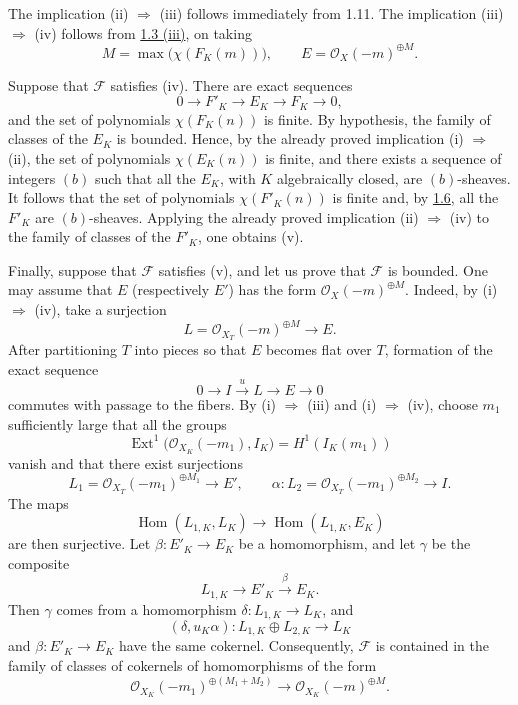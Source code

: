 The implication (ii) \(\Rightarrow\) (iii) follows immediately from 1.11.
The implication (iii) \(\Rightarrow\) (iv) follows from \hyperlink{sga6.e13.prop.1-3}{1.3 (iii)}, on
taking
\[
M=\max\bigl(\chi(F_K(m))\bigr),
\qquad E=\mathcal O_X(-m)^{\oplus M}.
\]

Suppose that \(\mathcal F\) satisfies (iv). There are exact sequences
\[
0\longrightarrow F'_K\longrightarrow E_K\longrightarrow F_K
\longrightarrow0,
\]
and the set of polynomials \(\chi(F_K(n))\) is finite. By hypothesis, the
family of classes of the \(E_K\) is bounded. Hence, by the already proved
implication (i) \(\Rightarrow\) (ii), the set of polynomials
\(\chi(E_K(n))\) is finite, and there exists a sequence of integers \((b)\)
such that all the \(E_K\), with \(K\) algebraically closed, are
\((b)\)-sheaves. It follows that the set of polynomials
\(\chi(F'_K(n))\) is finite and, by \hyperlink{sga6.e13.prop.1-6}{1.6}, all the \(F'_K\) are
\((b)\)-sheaves. Applying the already proved implication (ii)
\(\Rightarrow\) (iv) to the family of classes of the \(F'_K\), one obtains
(v).

Finally, suppose that \(\mathcal F\) satisfies (v), and let us prove that
\(\mathcal F\) is bounded. One may assume that \(E\) (respectively \(E'\))
has the form \(\mathcal O_X(-m)^{\oplus M}\). Indeed,
by (i) \(\Rightarrow\) (iv), take a surjection
\[
L=\mathcal O_{X_T}(-m)^{\oplus M}\longrightarrow E.
\]
After partitioning \(T\) into pieces so that \(E\) becomes flat over \(T\),
formation of the exact sequence
\[
0\longrightarrow I\xrightarrow{u}L\longrightarrow E\longrightarrow0
\]
commutes with passage to the fibers. By (i) \(\Rightarrow\) (iii) and
(i) \(\Rightarrow\) (iv), choose \(m_1\) sufficiently large that all the
groups
\[
\operatorname{Ext}^1\bigl(\mathcal O_{X_K}(-m_1),I_K\bigr)
=H^1(I_K(m_1))
\]
vanish and that there exist surjections
\[
L_1=\mathcal O_{X_T}(-m_1)^{\oplus M_1}\longrightarrow E',
\qquad
\alpha:L_2=\mathcal O_{X_T}(-m_1)^{\oplus M_2}\longrightarrow I.
\]
The maps
\[
\operatorname{Hom}(L_{1,K},L_K)\longrightarrow
\operatorname{Hom}(L_{1,K},E_K)
\]
are then surjective. Let \(\beta:E'_K\to E_K\) be a homomorphism, and let
\(\gamma\) be the composite
\[
L_{1,K}\longrightarrow E'_K\xrightarrow{\beta}E_K.
\]
Then \(\gamma\) comes from a homomorphism
\(\delta:L_{1,K}\to L_K\), and
\[
(\delta,u_K\alpha):L_{1,K}\oplus L_{2,K}\longrightarrow L_K
\]
and \(\beta:E'_K\to E_K\) have the same cokernel. Consequently,
\(\mathcal F\) is contained in the family of classes of cokernels of
homomorphisms of the form
\[
\mathcal O_{X_K}(-m_1)^{\oplus(M_1+M_2)}
\longrightarrow
\mathcal O_{X_K}(-m)^{\oplus M}.
\]

